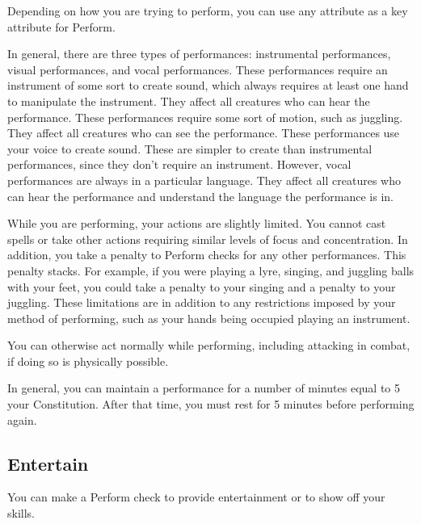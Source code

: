         Depending on how you are trying to perform, you can use any attribute as a key attribute for Perform.

        In general, there are three types of performances: instrumental performances, visual performances, and vocal performances.
         These performances require an instrument of some sort to create sound, which always requires at least one hand to manipulate the instrument.
        They affect all creatures who can hear the performance.
         These performances require some sort of motion, such as juggling.
        They affect all creatures who can see the performance.
         These performances use your voice to create sound.
        These are simpler to create than instrumental performances, since they don't require an instrument.
        However, vocal performances are always in a particular language.
        They affect all creatures who can hear the performance and understand the language the performance is in.

        While you are performing, your actions are slightly limited.
        You cannot cast spells or take other actions requiring similar levels of focus and concentration.
        In addition, you take a  penalty to Perform checks for any other performances.
        This penalty stacks.
        For example, if you were playing a lyre, singing, and juggling balls with your feet, you could take a  penalty to your singing and a  penalty to your juggling.
        These limitations are in addition to any restrictions imposed by your method of performing, such as your hands being occupied playing an instrument.

        You can otherwise act normally while performing, including attacking in combat, if doing so is physically possible.

        In general, you can maintain a performance for a number of minutes equal to 5 \add your Constitution.
        After that time, you must rest for 5 minutes before performing again.

    \subsection{Entertain}
        You can make a Perform check to provide entertainment or to show off your skills.

